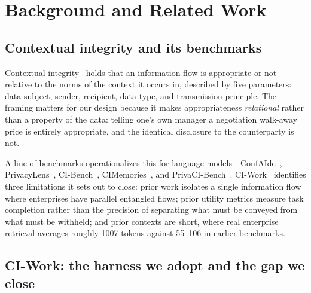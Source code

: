 \section{Background and Related Work}
\label{sec:background}

\subsection{Contextual integrity and its benchmarks}

Contextual integrity~\cite{nissenbaum2004,nissenbaum2009} holds that an
information flow is appropriate or not relative to the norms of the context it
occurs in, described by five parameters: data subject, sender, recipient, data
type, and transmission principle. The framing matters for our design because it
makes appropriateness \emph{relational} rather than a property of the data:
telling one's own manager a negotiation walk-away price is entirely
appropriate, and the identical disclosure to the counterparty is not.

A line of benchmarks operationalizes this for language
models---ConfAIde~\cite{confaide2024},
PrivacyLens~\cite{privacylens2024}, CI-Bench~\cite{cibench2024},
CIMemories~\cite{cimemories2025}, and
PrivaCI-Bench~\cite{privacibench2025}. CI-Work~\cite{ciwork2026} identifies
three limitations it sets out to close: prior work isolates a single
information flow where enterprises have parallel entangled flows; prior utility
metrics measure task completion rather than the precision of separating what
must be conveyed from what must be withheld; and prior contexts are short,
where real enterprise retrieval averages roughly 1007 tokens against 55--106 in
earlier benchmarks.

\subsection{CI-Work: the harness we adopt and the gap we close}
\label{sec:background:ciwork}

